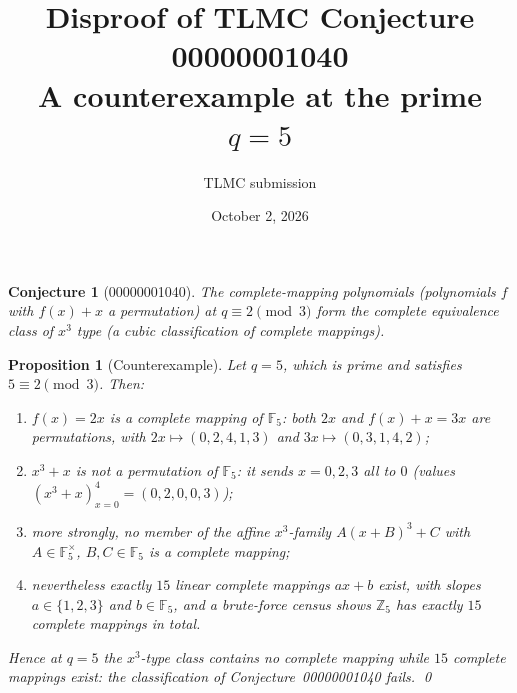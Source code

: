 \documentclass[11pt]{article}
\title{Disproof of TLMC Conjecture 00000001040\\
\large A counterexample at the prime $q = 5$}
\author{TLMC submission}
\date{October 2, 2026}
\newcommand{\F}{\mathbb{F}}
\newcommand{\Z}{\mathbb{Z}}
\theoremstyle{plain}
\newtheorem{conj}{Conjecture}
\newtheorem{prop}{Proposition}
\theoremstyle{remark}
\begin{document}
\maketitle

\begin{conj}[00000001040]
The complete-mapping polynomials (polynomials $f$ with $f(x)+x$ a permutation)
at $q \equiv 2 \pmod 3$ form the complete equivalence class of $x^3$ type
(a cubic classification of complete mappings).
\end{conj}

\begin{prop}[Counterexample]\label{prop:main}
Let $q = 5$, which is prime and satisfies $5 \equiv 2 \pmod 3$. Then:
\begin{enumerate}
\item $f(x) = 2x$ is a complete mapping of $\F_5$: both $2x$ and
$f(x)+x = 3x$ are permutations, with
$2x \mapsto (0,2,4,1,3)$ and $3x \mapsto (0,3,1,4,2)$;
\item $x^3 + x$ is not a permutation of $\F_5$: it sends $x = 0, 2, 3$ all
to $0$ (values $(x^3+x)_{x=0}^{4} = (0,2,0,0,3)$);
\item more strongly, \emph{no} member of the affine $x^3$-family
$A(x+B)^3 + C$ with $A \in \F_5^\times$, $B, C \in \F_5$ is a complete
mapping;
\item nevertheless exactly $15$ linear complete mappings $ax+b$ exist, with
slopes $a \in \{1,2,3\}$ and $b \in \F_5$, and a brute-force census shows
$\Z_5$ has exactly $15$ complete mappings in total.
\end{enumerate}
Hence at $q = 5$ the $x^3$-type class contains \emph{no} complete mapping
while $15$ complete mappings exist: the classification of
Conjecture~00000001040 fails. \qed
\end{prop}
\end{document}
